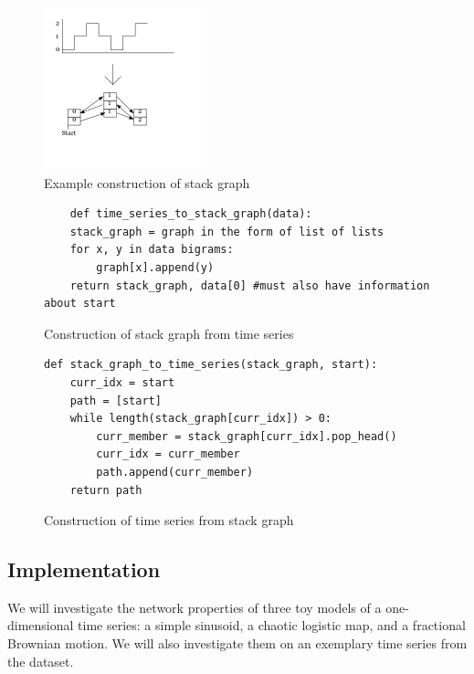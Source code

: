 \documentclass[12pt]{article}
\begin{document}
\begin{figure}\label{fig:stackgraph}
  \begin{center}
    \includegraphics[scale=0.6]{stack_graph_ex}
  \end{center}
  \caption{Example construction of stack graph}
\end{figure}

\begin{figure}\label{fig:stackconstructionalgo}
  \begin{singlespace}
    \begin{verbatim}
    def time_series_to_stack_graph(data):
    stack_graph = graph in the form of list of lists
    for x, y in data bigrams:
        graph[x].append(y)
    return stack_graph, data[0] #must also have information about start
    \end{verbatim}
  \end{singlespace}
  \caption{Construction of stack graph from time series}
\end{figure}

\begin{figure}\label{fig:timeconstructionalgo}
\begin{singlespace}
\begin{verbatim}
def stack_graph_to_time_series(stack_graph, start):
    curr_idx = start
    path = [start]
    while length(stack_graph[curr_idx]) > 0:
        curr_member = stack_graph[curr_idx].pop_head()
        curr_idx = curr_member
        path.append(curr_member)
    return path
\end{verbatim}
\end{singlespace}
  \caption{Construction of time series from stack graph}
\end{figure}

\subsection{Implementation}

We will investigate the network properties of three toy models of a one-dimensional time series: a simple sinusoid, a chaotic logistic map, and a fractional Brownian motion. We will also investigate them on an exemplary time series from the dataset.
\end{document}
